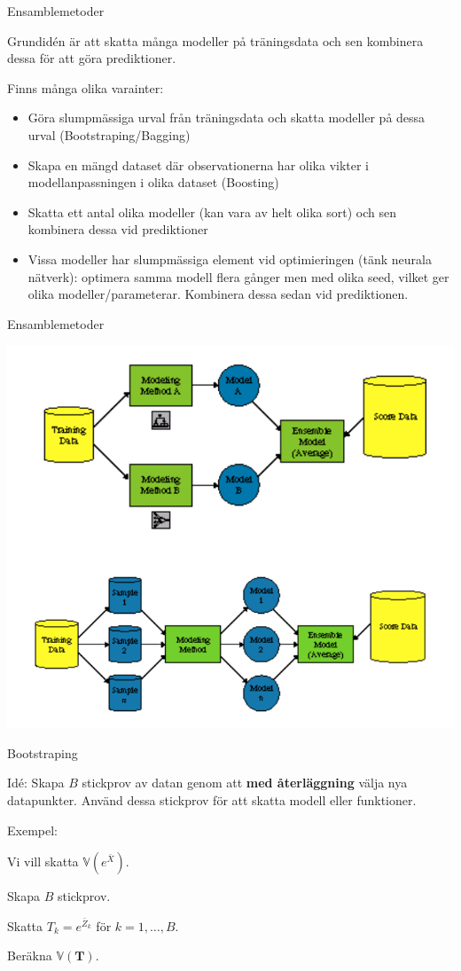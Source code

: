 \documentclass[10pt,english]{beamer}
\begin{document}
\begin{frame}{Ensamblemetoder}
    
    Grundidén är att skatta många modeller på träningsdata och sen kombinera dessa för att göra prediktioner.
    
    Finns många olika varainter:
     \begin{itemize}
        \item Göra slumpmässiga urval från träningsdata och skatta modeller på dessa urval (Bootstraping/Bagging)
        \item Skapa en mängd dataset där observationerna har olika vikter i modellanpassningen i olika dataset (Boosting)
        \item Skatta ett antal olika modeller (kan vara av helt olika sort) och sen kombinera dessa vid prediktioner
        \item Vissa modeller har slumpmässiga element vid optimieringen (tänk neurala nätverk): optimera samma modell flera gånger men med olika seed, vilket ger olika modeller/parameterar. Kombinera dessa sedan vid prediktionen.
    \end{itemize}

\end{frame}


\begin{frame}{Ensamblemetoder}
    
    \includegraphics[width=.8\textwidth]{figs/ensample_cat.png}

\end{frame}

\begin{frame}{Bootstraping}
    
    \begin{greenbox}
        Idé: Skapa $B$ stickprov av datan genom att \textbf{med återläggning} välja nya datapunkter. Använd dessa stickprov för att skatta modell eller funktioner.
    \end{greenbox}

    Exempel:

    Vi vill skatta $\mathbb{V}(e^{\bar{X}})$.

    Skapa $B$ stickprov.

    Skatta $T_k = e^{\bar{Z}_k}$ för $k = 1, \ldots, B$.

    Beräkna $\mathbb{V}(\mathbf{T})$.


\end{frame}
\end{document}
